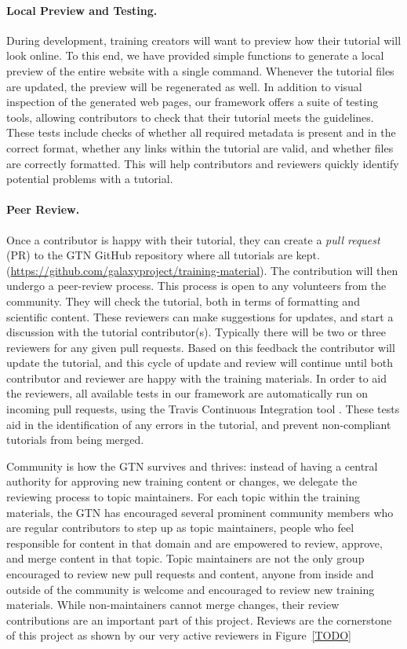 \documentclass[10pt,letterpaper]{article}
\begin{document}
\paragraph*{Local Preview and Testing.} During development, training creators will want to preview how their tutorial will look online.
To this end, we have provided simple functions to generate a local preview of the entire website with a single command. Whenever the tutorial files are updated, the preview will be regenerated as well.
In addition to visual inspection of the generated web pages, our framework offers a suite of testing tools, allowing contributors to check that their tutorial meets the guidelines.
These tests include checks of whether all required metadata is present and in the correct format, whether any links within the tutorial are valid, and whether files are correctly formatted.
This will help contributors and reviewers quickly identify potential problems with a tutorial.


\paragraph*{Peer Review.} Once a contributor is happy with their tutorial, they can create a \emph{pull request} (PR) to the GTN GitHub repository where all tutorials are kept.  (\url{https://github.com/galaxyproject/training-material}).
The contribution will then undergo a peer-review process.
This process is open to any volunteers from the community.  They will check the tutorial, both in terms of formatting and scientific content.
These reviewers can make suggestions for updates, and start a discussion with the tutorial contributor(s).
Typically there will be two or three reviewers for any given pull requests.
Based on this feedback the contributor will update the tutorial, and this cycle of update and review will continue until both contributor and reviewer are happy with the training materials.
In order to aid the reviewers, all available tests in our framework are automatically run on incoming pull requests, using the Travis Continuous Integration tool \cite{TODO}. %
These tests aid in the identification of any errors in the tutorial, and prevent non-compliant tutorials from being merged.

Community is how the GTN survives and thrives: instead of having a central authority for approving new training content or changes, we delegate the reviewing process to topic maintainers.
For each topic within the training materials, the GTN has encouraged several prominent community members who are regular contributors to step up as topic maintainers, people who feel responsible for content in that domain and are empowered to review, approve, and merge content in that topic.
Topic maintainers are not the only group encouraged to review new pull requests and content, anyone from inside and outside of the community is welcome and encouraged to review new training materials.
While non-maintainers cannot merge changes, their review contributions are an important part of this project.
Reviews are the cornerstone of this project as shown by our very active reviewers in Figure~\ref{TODO}
\end{document}
